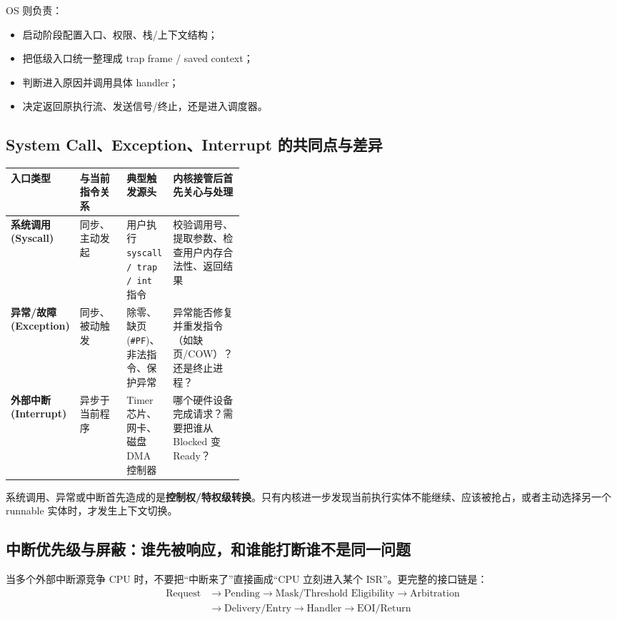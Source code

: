 \documentclass[11pt,a4paper]{ctexart}
\newcommand{\kw}[1]{\textbf{#1}}
\newcommand{\code}[1]{\texttt{#1}}
\begin{document}
OS 则负责：
\begin{itemize}
  \item 启动阶段配置入口、权限、栈/上下文结构；
  \item 把低级入口统一整理成 trap frame / saved context；
  \item 判断进入原因并调用具体 handler；
  \item 决定返回原执行流、发送信号/终止，还是进入调度器。
\end{itemize}

\subsection{System Call、Exception、Interrupt 的共同点与差异}

\begingroup
\small
\renewcommand{\arraystretch}{1.25}
\setlength{\tabcolsep}{6pt}
\begin{tabularx}{\linewidth}{>{\bfseries}p{0.18\linewidth} >{\raggedright\arraybackslash}p{0.20\linewidth} X X}
\toprule
入口类型 & 与当前指令关系 & 典型触发源头 & 内核接管后首先关心与处理\\
\midrule
系统调用 (Syscall) & 同步、主动发起 & 用户执行 \code{syscall / trap / int} 指令 & 校验调用号、提取参数、检查用户内存合法性、返回结果\\
异常/故障 (Exception) & 同步、被动触发 & 除零、缺页 (\code{\#PF})、非法指令、保护异常 & 异常能否修复并重发指令（如缺页/COW）？还是终止进程？\\
外部中断 (Interrupt) & 异步于当前程序 & Timer 芯片、网卡、磁盘 DMA 控制器 & 哪个硬件设备完成请求？需要把谁从 Blocked 变 Ready？\\
\bottomrule
\end{tabularx}
\endgroup

\begin{exam}[408 核心：进入内核态不等于上下文切换]
系统调用、异常或中断首先造成的是\kw{控制权/特权级转换}。只有内核进一步发现当前执行实体不能继续、应该被抢占，或者主动选择另一个 runnable 实体时，才发生上下文切换。
\end{exam}

\subsection{中断优先级与屏蔽：谁先被响应，和谁能打断谁不是同一问题}

当多个外部中断源竞争 CPU 时，不要把“中断来了”直接画成“CPU 立刻进入某个 ISR”。更完整的接口链是：
\[
\boxed{
\begin{aligned}
\text{Request} &\to \text{Pending} \to \text{Mask/Threshold Eligibility} \to \text{Arbitration} \\
&\to \text{Delivery/Entry} \to \text{Handler} \to \text{EOI/Return}
\end{aligned}
}
\]
\end{document}

